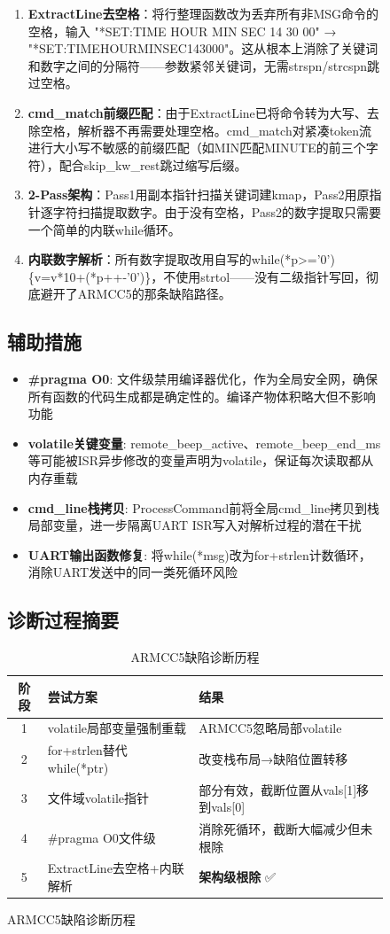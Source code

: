 \documentclass[12pt,hyperref,a4paper,UTF8]{ctexart}
\begin{document}
\begin{figure}[!htbp]
\begin{enumerate}
    \item \textbf{ExtractLine去空格}：将行整理函数改为丢弃所有非MSG命令的空格，输入 "*SET:TIME HOUR MIN SEC 14 30 00" → "*SET:TIMEHOURMINSEC143000"。这从根本上消除了关键词和数字之间的分隔符——参数紧邻关键词，无需strspn/strcspn跳过空格。
    \item \textbf{cmd\_match前缀匹配}：由于ExtractLine已将命令转为大写、去除空格，解析器不再需要处理空格。cmd\_match对紧凑token流进行大小写不敏感的前缀匹配（如MIN匹配MINUTE的前三个字符），配合skip\_kw\_rest跳过缩写后缀。
    \item \textbf{2-Pass架构}：Pass1用副本指针扫描关键词建kmap，Pass2用原指针逐字符扫描提取数字。由于没有空格，Pass2的数字提取只需要一个简单的内联while循环。
    \item \textbf{内联数字解析}：所有数字提取改用自写的while(*p>='0')\{v=v*10+(*p++-'0')\}，不使用strtol——没有二级指针写回，彻底避开了ARMCC5的那条缺陷路径。
\end{enumerate}

\subsection{辅助措施}

\begin{itemize}
    \item \textbf{\#pragma O0}: 文件级禁用编译器优化，作为全局安全网，确保所有函数的代码生成都是确定性的。编译产物体积略大但不影响功能
    \item \textbf{volatile关键变量}: remote\_beep\_active、remote\_beep\_end\_ms等可能被ISR异步修改的变量声明为volatile，保证每次读取都从内存重载
    \item \textbf{cmd\_line栈拷贝}: ProcessCommand前将全局cmd\_line拷贝到栈局部变量，进一步隔离UART ISR写入对解析过程的潜在干扰
    \item \textbf{UART输出函数修复}: 将while(*msg)改为for+strlen计数循环，消除UART发送中的同一类死循环风险
\end{itemize}

\subsection{诊断过程摘要}

\begin{table}[!htbp]
    \centering
    \begin{tabular}{c|l|l}
    \hline
    \textbf{阶段} & \textbf{尝试方案} & \textbf{结果} \\
    \hline
    1 & volatile局部变量强制重载 & ARMCC5忽略局部volatile \\
    2 & for+strlen替代while(*ptr) & 改变栈布局→缺陷位置转移 \\
    3 & 文件域volatile指针 & 部分有效，截断位置从vals[1]移到vals[0] \\
    4 & \#pragma O0文件级 & 消除死循环，截断大幅减少但未根除 \\
    5 & ExtractLine去空格+内联解析 & \textbf{架构级根除} ✅ \\
    \hline
    \end{tabular}
    \caption{ARMCC5缺陷诊断历程}
\end{table}


\end{figure}
\end{document}

